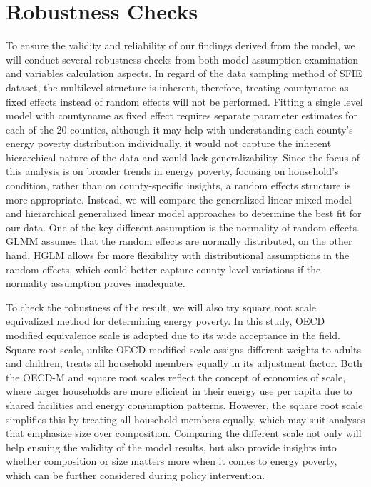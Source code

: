 \documentclass[
  twoside,
  openright,
  degree    = master,               %
  language  = english,              %
  fontset   = overleaf,             %
  watermark = true,                 %
  doi       = true,                 %
]{ntuthesis}
\begin{document}
\hypertarget{robustness-checks}{%
\section{Robustness Checks}\label{robustness-checks}}

To ensure the validity and reliability of our findings derived from the
model, we will conduct several robustness checks from both model
assumption examination and variables calculation aspects. In regard of
the data sampling method of SFIE dataset, the multilevel structure is
inherent, therefore, treating countyname as fixed effects instead of
random effects will not be performed. Fitting a single level model with
countyname as fixed effect requires separate parameter estimates for
each of the 20 counties, although it may help with understanding each
county's energy poverty distribution individually, it would not capture
the inherent hierarchical nature of the data and would lack
generalizability. Since the focus of this analysis is on broader trends
in energy poverty, focusing on household's condition, rather than on
county-specific insights, a random effects structure is more
appropriate. Instead, we will compare the generalized linear mixed model
and hierarchical generalized linear model approaches to determine the
best fit for our data. One of the key different assumption is the
normality of random effects. GLMM assumes that the random effects are
normally distributed, on the other hand, HGLM allows for more
flexibility with distributional assumptions in the random effects, which
could better capture county-level variations if the normality assumption
proves inadequate.

To check the robustness of the result, we will also try square root
scale equivalized method for determining energy poverty. In this study,
OECD modified equivalence scale is adopted due to its wide acceptance in
the field. Square root scale, unlike OECD modified scale assigns
different weights to adults and children, treats all household members
equally in its adjustment factor. Both the OECD-M and square root scales
reflect the concept of economies of scale, where larger households are
more efficient in their energy use per capita due to shared facilities
and energy consumption patterns. However, the square root scale
simplifies this by treating all household members equally, which may
suit analyses that emphasize size over composition. Comparing the
different scale not only will help ensuing the validity of the model
results, but also provide insights into whether composition or size
matters more when it comes to energy poverty, which can be further
considered during policy intervention.
\end{document}
